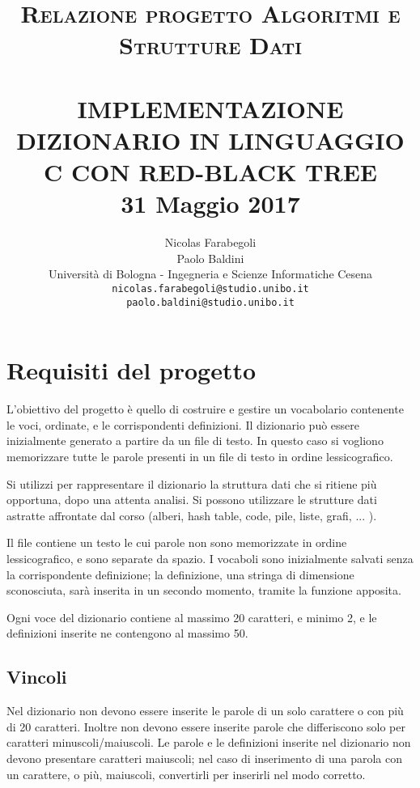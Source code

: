 \documentclass[paper=a4, fontsize=11pt,twoside]{scrartcl}   %
\title{ \normalsize \textsc{Relazione progetto Algoritmi e Strutture Dati}    %
	\\[2.0cm]                               %
	\HRule{0.5pt} \\                        %
	\LARGE \textbf{\uppercase{Implementazione dizionario in linguaggio 
			C con Red-Black Tree}}    %
	\HRule{2pt} \\ [0.5cm]      %
	\normalsize 31 Maggio 2017          %
}
\author{
	Nicolas Farabegoli\\
	Paolo Baldini\\
	Università di Bologna - Ingegneria e Scienze Informatiche Cesena\\  
	\texttt{nicolas.farabegoli@studio.unibo.it} \\
	\texttt{paolo.baldini@studio.unibo.it}\\
}
\makeatletter
\def\printtitle{%
	{\centering \@title\par}}
\def\printauthor{%
	{\centering \large \@author}}
\makeatother
\begin{document}
	\thispagestyle{empty}       %
	
	\printtitle                 %
	\vfill
	\printauthor                %
	\newpage
	\tableofcontents
	\newpage
	\setcounter{page}{1}        %
	
	\section{Requisiti del progetto}
		L'obiettivo del progetto è quello di costruire e gestire un vocabolario 
		contenente le voci, ordinate, e le corrispondenti definizioni. 
		Il dizionario può essere inizialmente generato a partire da un file di testo.  
		In questo caso si vogliono memorizzare tutte le parole presenti in un file di 
		testo in ordine lessicografico.
		
		Si utilizzi per rappresentare il dizionario la struttura dati che si ritiene 
		più opportuna, dopo una attenta analisi. Si possono utilizzare le strutture 
		dati astratte affrontate dal corso (alberi, hash table, code, pile, liste, 
		grafi, ... ).
		
		Il file contiene un testo le cui parole non sono memorizzate in ordine lessicografico, e sono separate da spazio. I vocaboli sono inizialmente salvati senza la corrispondente definizione; la definizione, una stringa di dimensione sconosciuta, sarà inserita in un secondo momento, tramite la funzione apposita.
		
		Ogni voce del dizionario contiene al massimo 20 caratteri, e minimo 2, e le definizioni inserite ne contengono al massimo 50.
		
			\subsection{Vincoli}
				Nel dizionario non devono essere inserite le parole di un solo carattere o con più di 20 caratteri. Inoltre non devono essere inserite parole che differiscono solo per caratteri minuscoli/maiuscoli. Le parole e le definizioni inserite nel dizionario non devono presentare caratteri maiuscoli; nel caso di inserimento di una parola con un carattere, o più, maiuscoli, convertirli per inserirli nel modo corretto. 
				
\end{document}
